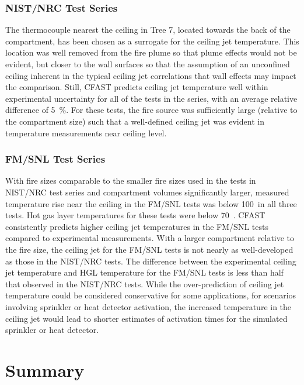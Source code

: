 \subsubsection{NIST/NRC Test Series}

The thermocouple nearest the ceiling in Tree 7, located towards the back of the compartment, has been chosen as a surrogate for the ceiling jet temperature. This location was well removed from the fire plume so that plume effects would not be evident, but closer to the wall surfaces so that the assumption of an unconfined ceiling inherent in the typical ceiling jet correlations that wall effects may impact the comparison. Still, CFAST predicts ceiling jet temperature well within experimental uncertainty for all of the tests in the series, with an average relative difference of 5~\%.  For these tests, the fire source was sufficiently large (relative to the compartment size) such that a well-defined ceiling jet was evident in temperature measurements near ceiling level.

\subsubsection{FM/SNL Test Series}

With fire sizes comparable to the smaller fire sizes used in the tests in NIST/NRC test series and compartment volumes significantly larger, measured temperature rise near the ceiling in the FM/SNL tests was below 100~\degc in all three tests.  Hot gas layer temperatures for these tests were below 70~\degc.  CFAST consistently predicts higher ceiling jet temperatures in the FM/SNL tests compared to experimental measurements.  With a larger compartment relative to the fire size, the ceiling jet for the FM/SNL tests is not nearly as well-developed as those in the NIST/NRC tests.  The difference between the experimental ceiling jet temperature and HGL temperature for the FM/SNL tests is less than half that observed in the NIST/NRC tests.  While the over-prediction of ceiling jet temperature could be considered conservative for some applications, for scenarios involving sprinkler or heat detector activation, the increased temperature in the ceiling jet would lead to shorter estimates of activation times for the simulated sprinkler or heat detector.

\section{Summary}

